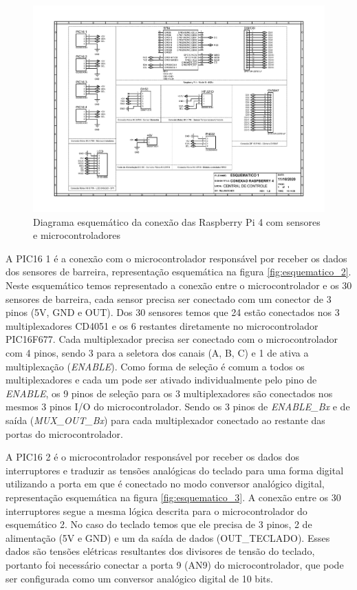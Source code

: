 \begin{apendicesenv}
\begin{landscape}
\begin{figure}[!htb]
    \centering
    \vspace{-2cm}
    \includegraphics[width=1.25\textwidth, height=2\textheight,keepaspectratio]{figuras/esquematico_eletronica/esquematico_1_rpi4.pdf}
    \caption{Diagrama esquemático da conexão das Raspberry Pi 4 com sensores e microcontroladores}
    \label{fig:esquematico_1}
\end{figure}
\end{landscape}


A PIC16 1 é a conexão com o microcontrolador  responsável por receber os dados dos sensores de barreira, representação esquemática na figura \ref{fig:esquematico_2}. Neste esquemático temos representado a conexão entre o microcontrolador e os 30 sensores de barreira, cada sensor precisa ser conectado com um conector de 3 pinos (5V, GND e OUT). Dos 30 sensores temos que 24 estão conectados nos 3 multiplexadores CD4051 e os 6 restantes diretamente no microcontrolador PIC16F677. Cada multiplexador precisa ser conectado com o microcontrolador com 4 pinos, sendo 3 para a seletora dos canais (A, B, C) e 1 de ativa a multiplexação (\textit{ENABLE}). Como forma de seleção é comum a todos os multiplexadores e cada um pode ser ativado  individualmente pelo pino de \textit{ENABLE}, os 9 pinos de seleção para os 3 multiplexadores são conectados nos mesmos 3 pinos I/O do microcontrolador. Sendo os 3 pinos de \textit{ENABLE\_Bx} e de saída (\textit{MUX\_OUT\_Bx}) para cada multiplexador conectado ao restante das portas do microcontrolador.

A PIC16 2 é o microcontrolador responsável por receber os dados dos interruptores e traduzir as tensões analógicas do teclado para uma forma digital utilizando a porta em que é conectado no modo conversor analógico digital, representação esquemática na figura \ref{fig:esquematico_3}. A conexão entre os 30 interruptores segue a mesma lógica descrita para o microcontrolador do esquemático 2. No caso do teclado temos que ele precisa de 3 pinos, 2 de alimentação (5V e GND) e um da saída de dados (OUT\_TECLADO). Esses dados são tensões elétricas resultantes dos divisores de tensão do teclado, portanto foi necessário conectar a porta 9 (AN9) do microcontrolador, que pode ser configurada como um conversor analógico digital de 10 bits.



\end{apendicesenv}
